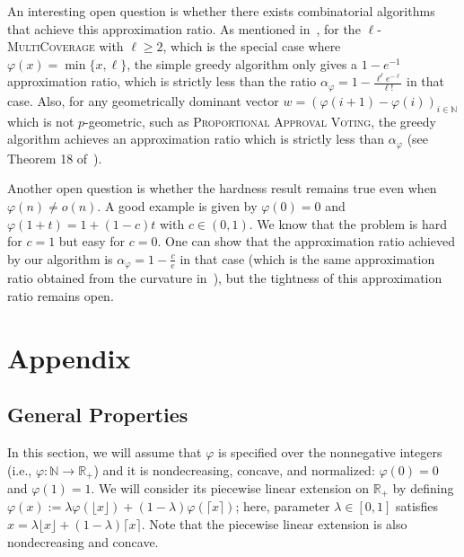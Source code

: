 An interesting open question is whether there exists combinatorial algorithms that achieve this approximation ratio. As mentioned in~\cite{BFGG20}, for the $\ell$-\textsc{MultiCoverage} with $\ell \geq 2$, which is the special case where $\varphi(x) = \min\{x,\ell\}$, the simple greedy algorithm only gives a $1 - e^{-1}$ approximation ratio, which is strictly less than the ratio $\alpha_{\varphi} = 1-\frac{\ell^{\ell}e^{-\ell}}{\ell!}$ in that case. Also, for any geometrically dominant vector $w=(\varphi(i+1)-\varphi(i))_{i \in \mathbb{N}}$ which is not $p$-geometric, such as \textsc{Proportional Approval Voting}, the greedy algorithm achieves an approximation ratio which is strictly less than $\alpha_{\varphi}$ (see Theorem 18 of~\cite{DMMS20}).

Another open question is whether the hardness result remains true even when $\varphi(n) \not= o(n)$. A good example is given by $\varphi(0)=0$ and $\varphi(1+t) = 1 + (1-c)t$ with $c \in (0,1)$. We know that the problem is hard for $c=1$ but easy for $c=0$. One can show that the approximation ratio achieved by our algorithm is $\alpha_{\varphi} = 1 - \frac{c}{e}$ in that case (which is the same approximation ratio obtained from the curvature in~\cite{SVW17}), but the tightness of this approximation ratio remains open.

\newpage
\section{Appendix}
\subsection{General Properties}
In this section, we will assume that $\varphi$ is specified over the nonnegative integers (i.e., $\varphi : \mathbb{N} \rightarrow \mathbb{R}_+$) and it is nondecreasing, concave, and normalized: $\varphi(0)=0$ and $\varphi(1)=1$. We will consider its piecewise linear extension on  $\mathbb{R}_+$ by defining $\varphi(x) := \lambda \varphi(\lfloor x \rfloor) + (1-\lambda)\varphi(\lceil x \rceil)$; here, parameter $\lambda\in [0,1]$ satisfies $x = \lambda\lfloor x \rfloor + (1-\lambda)\lceil x \rceil$. Note that the piecewise linear extension is also nondecreasing and concave.

